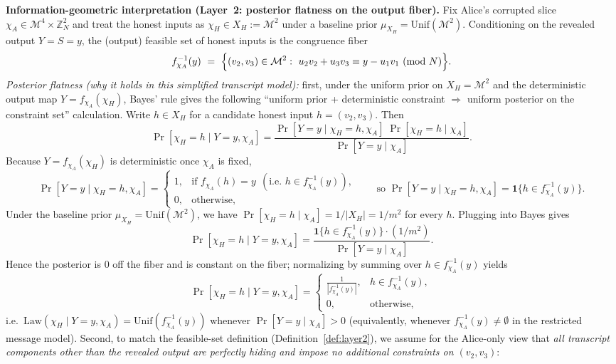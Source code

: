\documentclass[11pt,a4paper]{article}
\theoremstyle{definition}
\theoremstyle{plain}
\newcommand{\Z}{\mathbb{Z}}
\begin{document}
\begin{description}
    \textbf{Information-geometric interpretation (Layer~2: posterior flatness on the output fiber).}
    Fix Alice's corrupted slice $\chi_A\in\mathcal{M}^4\times \Z_N^2$ and treat the honest inputs as $\chi_H\in X_H:=\mathcal{M}^2$ under a baseline prior $\mu_{X_H}=\mathrm{Unif}(\mathcal{M}^2)$.
    Conditioning on the revealed output $Y=S=y$, the (output) feasible set of honest inputs is the congruence fiber
    \[
    f_{\chi_A}^{-1}(y)\ =\ \Bigl\{(v_2,v_3)\in\mathcal{M}^2:\ u_2v_2+u_3v_3\equiv y-u_1v_1\ (\mathrm{mod}\ N)\Bigr\}.
    \]
    \emph{Posterior flatness (why it holds in this simplified transcript model):}
    first, under the uniform prior on $X_H=\mathcal{M}^2$ and the deterministic output map $Y=f_{\chi_A}(\chi_H)$, Bayes' rule gives the following ``uniform prior + deterministic constraint $\Rightarrow$ uniform posterior on the constraint set'' calculation.
    Write $h\in X_H$ for a candidate honest input $h=(v_2,v_3)$.
    Then
    \[
    \Pr[\chi_H=h\mid Y=y,\chi_A]
    =\frac{\Pr[Y=y\mid \chi_H=h,\chi_A]\;\Pr[\chi_H=h\mid \chi_A]}{\Pr[Y=y\mid \chi_A]}.
    \]
    Because $Y=f_{\chi_A}(\chi_H)$ is deterministic once $\chi_A$ is fixed,
    \[
    \Pr[Y=y\mid \chi_H=h,\chi_A]
    =
    \begin{cases}
      1,& \text{if } f_{\chi_A}(h)=y\ \ (\text{i.e.\ }h\in f_{\chi_A}^{-1}(y)),\\
      0,& \text{otherwise,}
    \end{cases}
    \qquad\text{so } \Pr[Y=y\mid \chi_H=h,\chi_A]=\mathbf{1}\{h\in f_{\chi_A}^{-1}(y)\}.
    \]
    Under the baseline prior $\mu_{X_H}=\mathrm{Unif}(\mathcal{M}^2)$, we have $\Pr[\chi_H=h\mid \chi_A]=1/|X_H|=1/m^2$ for every $h$.
    Plugging into Bayes gives
    \[
    \Pr[\chi_H=h\mid Y=y,\chi_A]
    =\frac{\mathbf{1}\{h\in f_{\chi_A}^{-1}(y)\}\cdot (1/m^2)}{\Pr[Y=y\mid \chi_A]}.
    \]
    Hence the posterior is $0$ off the fiber and is constant on the fiber; normalizing by summing over $h\in f_{\chi_A}^{-1}(y)$ yields
    \[
    \Pr[\chi_H=h\mid Y=y,\chi_A]
    =
    \begin{cases}
      \frac{1}{|f_{\chi_A}^{-1}(y)|},& h\in f_{\chi_A}^{-1}(y),\\
      0,& \text{otherwise,}
    \end{cases}
    \]
    i.e.\ $\mathrm{Law}(\chi_H\mid Y=y,\chi_A)=\mathrm{Unif}(f_{\chi_A}^{-1}(y))$ whenever $\Pr[Y=y\mid \chi_A]>0$ (equivalently, whenever $f_{\chi_A}^{-1}(y)\neq\emptyset$ in the restricted message model).
    Second, to match the feasible-set definition (Definition~\ref{def:layer2}), we assume for the Alice-only view that \emph{all transcript components other than the revealed output are perfectly hiding and impose no additional constraints on $(v_2,v_3)$}:

\end{description}
\end{document}
